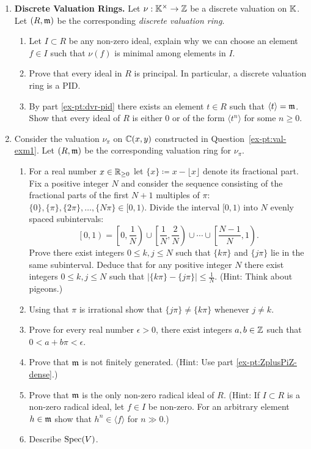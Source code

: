 \documentclass[12pt,reqno]{amsart}
\begin{document}
\begin{enumerate}[leftmargin=*]
\item \textbf{Discrete Valuation Rings.} Let $\nu:\mathbb{K}^{\times} \to \mathbb{Z}$ be a discrete valuation on $\mathbb{K}$. Let $(R,\mathfrak{m})$ be the corresponding \emph{discrete valuation ring}. 
 \begin{enumerate}[label=(\alph*),ref=\theenumi\alph*]
	\item Let $I \subset R$ be any non-zero ideal, explain why we can choose an element $f \in I $ such that $\nu(f)$ is minimal among elements in $I$.
	\item\label{ex-pt:dvr-pid}  Prove that every ideal in $R$ is principal. In particular, a discrete valuation ring is a PID. 
	\item By part \ref{ex-pt:dvr-pid} there exists an element $t\in R$ such that $\langle t \rangle = \mathfrak{m}$. Show that every ideal of $R$ is either $0$ or of the form $\langle t^{n} \rangle$ for some $n\geq0$. 
\end{enumerate}

\item Consider the valuation $\nu_{\pi}$ on $\mathbb{C}(x,y)$ constructed in Question~\ref{ex-pt:val-exm1}. Let $(R,\mathfrak{m})$ be the corresponding valuation ring for $\nu_{\pi}$.
 \begin{enumerate}[label=(\alph*),ref=\theenumi\alph*]
 	\item For a real number $x \in \mathbb{R}_{\geq 0}$ let $\{x\}\coloneqq x - \lfloor x \rfloor$ denote its fractional part. Fix a positive integer $N$ and consider the sequence consisting of the fractional parts of the first $N+1$ multiples of $\pi$: $\{0\}, \{\pi\}, \{2\pi\},\ldots,\{N\pi\} \in [0,1)$. Divide the interval $[0,1)$ into $N$ evenly spaced subintervals: 
	\[
	\left[0, 1\right) = \left[0,\frac{1}{N}\right) \cup \left[\frac{1}{N},\frac{2}{N}\right)\cup \cdots \cup \left[\frac{N-1}{N},1\right).
	\] 
	Prove there exist integers $0\leq k,j\leq N$ such that $\{k\pi\}$ and $\{j\pi\}$ lie in the same subinterval. Deduce that for any positive integer $N$ there exist integers $0\leq k,j\leq N$ such that $|\{k\pi\} - \{j\pi\}| \leq \frac{1}{N}$. (Hint: Think about pigeons.)
	\item Using that $\pi$ is irrational show that $\{j\pi\}\neq \{k\pi\}$ whenever $j\neq k$. 
 	\item\label{ex-pt:ZplusPiZ-dense} Prove for every real number $\epsilon>0$, there exist integers $a,b\in \mathbb{Z}$ such that $0 < a+b\pi < \epsilon$. 
	\item Prove that $\mathfrak{m}$ is not finitely generated. (Hint: Use part \ref{ex-pt:ZplusPiZ-dense}.)
	\item Prove that $\mathfrak{m}$ is the only non-zero radical ideal of $R$. (Hint: If $I \subset R$ is a non-zero radical ideal, let $f \in I$ be non-zero. For an arbitrary element $h \in \mathfrak{m}$ show that $h^{n} \in \langle f \rangle$ for $n \gg0$.)
	\item Describe $\operatorname{Spec}(V)$. 
\end{enumerate}
 

\end{enumerate}
\end{document}
